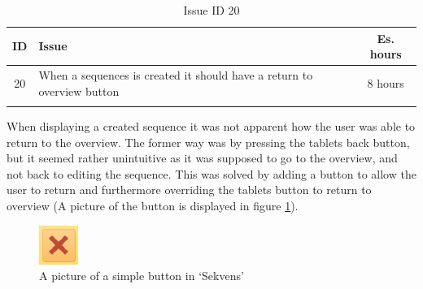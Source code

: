 \begin{longtable} { | c | p{12cm} | c | } 
\hline
	ID 	&	Issue	&		 Es. hours \\\hline
	20	& 	When a sequences is created it should have a return to overview button	&	8 hours	\\\hline
\caption{Issue ID 20}
\label{tab:spr1_issue20}
\end{longtable}
When displaying a created sequence it was not apparent how the user was able to return to the overview. The former way was by pressing the tablets back button, but it seemed rather unintuitive as it was supposed to go to the overview, and not back to editing the sequence. This was solved by adding a button to allow the user to return and furthermore overriding the tablets button to return to overview (A picture of the button is displayed in figure \ref{fig:Old_backButton}).
\begin{figure} [h!]
\centering
\includegraphics{Pics/Sprint1/Gammelt/back_button}
\caption{A picture of a simple button in `Sekvens'}
\label{fig:Old_backButton}
\end{figure} 